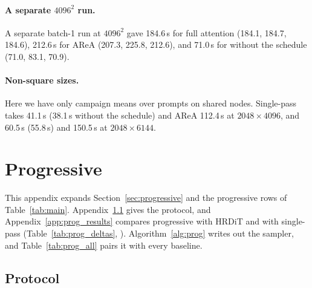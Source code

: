 \paragraph{A separate $4096^2$ run.} A separate batch-1 run at $4096^2$ gave 184.6\,s for full attention (184.1, 184.7, 184.6), 212.6\,s for AReA (207.3, 225.8, 212.6), and 71.0\,s for \sca{} without the schedule (71.0, 83.1, 70.9).

\paragraph{Non-square sizes.} Here we have only campaign means over \nmain{} prompts on shared nodes. Single-pass \sca{} takes 41.1\,s (38.1\,s without the schedule) and AReA 112.4\,s at $2048\times4096$, and 60.5\,s (55.8\,s) and 150.5\,s at $2048\times6144$.
\fi

\ifshortversion\else
\apxbarrier
\section{Progressive \texorpdfstring{\sca{}}{SCA}}
\label{app:prog}

This appendix expands Section~\ref{sec:progressive} and the progressive rows of Table~\ref{tab:main}. Appendix~\ref{app:prog_protocol} gives the protocol, and Appendix~\ref{app:prog_results} compares progressive \sca{} with HRDiT and with single-pass \sca{} (Table~\ref{tab:prog_deltas}, ). Algorithm~\ref{alg:prog} writes out the sampler, and Table~\ref{tab:prog_all} pairs it with every baseline.

\subsection{Protocol}
\label{app:prog_protocol}


